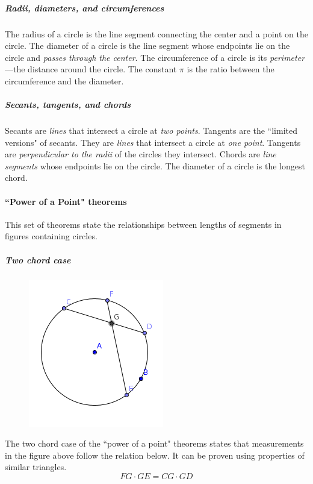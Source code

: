 \subparagraph{Radii, diameters, and circumferences}
The radius of a circle is the line segment connecting the center and a point on the circle.
The diameter of a circle is the line segment whose endpoints lie on the circle and \emph{passes through the center}.
The circumference of a circle is its \emph{perimeter}---the distance around the circle.
The constant $\pi$ is the ratio between the circumference and the diameter.

\subparagraph{Secants, tangents, and chords}
Secants are \emph{lines} that intersect a circle at \emph{two points}.
Tangents are the ``limited versions" of secants.
They are \emph{lines} that intersect a circle at \emph{one point}.
Tangents are \emph{perpendicular to the radii} of the circles they intersect.
Chords are \emph{line segments} whose endpoints lie on the circle.
The diameter of a circle is the longest chord.

\paragraph{``Power of a Point" theorems}
This set of theorems state the relationships between lengths of segments in figures containing circles.

\subparagraph{Two chord case}
\begin{figure}[h!]
    \centering
    \includegraphics[scale=0.5]{assets/images/twochord.png}
\end{figure}
The two chord case of the ``power of a point" theorems states that measurements in the figure above follow the relation below.
It can be proven using properties of similar triangles.
$$FG\cdot GE = CG\cdot GD$$

